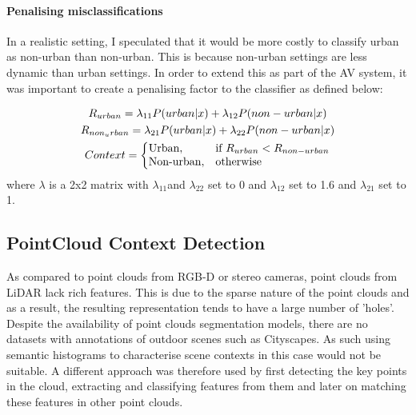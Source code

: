 \paragraph{Penalising misclassifications} In a realistic setting, I speculated that it would be more costly to classify urban as non-urban than non-urban. This is because non-urban settings are less dynamic than urban settings. In order to extend this as part of the AV system, it was important to create a penalising factor to the classifier as defined below: 

\noindent


\begin{gather*}
	R_{urban} = \lambda _{11}P(urban |x) + \lambda _{12}P(non-urban|x)  \\ 
	R_{non_urban} = \lambda_{21}P(urban|x) + \lambda _{22}P(non-urban|x)\\ 
	Context=\left\{
		\begin{array}{@{}ll@{}}
		\text{Urban}, & \text{if}\ R_{urban} < R_{non-urban}  \\
		\text{Non-urban}, & \text{otherwise}
		\end{array}\right.
\end{gather*} 
where $\lambda $ is a 2x2 matrix with $\lambda_{11}$and $\lambda_{22}$ set to 0 and $\lambda_{12}$ set to 1.6 and $\lambda_{21}$ set to 1.





\subsection{PointCloud Context Detection}
As compared to point clouds from RGB-D or stereo cameras, point clouds from LiDAR lack rich features. This is due to the sparse nature of the point clouds and as a result, the resulting representation tends to have a large number of 'holes'. Despite the availability of point clouds segmentation models, there are no datasets with annotations of outdoor scenes such as Cityscapes. As such using semantic histograms to characterise scene contexts in this case would not be suitable.
A different approach was therefore used by first detecting the key points in the cloud, extracting and classifying features from them and later on matching these features in other point clouds.  

